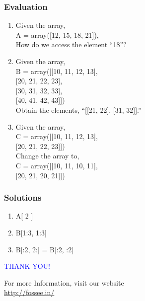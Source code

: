 \documentclass[presentation]{beamer}
\begin{document}
\begin{frame}
\frametitle{Evaluation}
\label{sec-14}


\begin{enumerate}
\item Given the array,\\ A = array([12, 15, 18, 21]),\\ How do we access the element ``18''?
\vspace{2pt}
\item Given the array,\\ 
B = array([[10, 11, 12, 13],\\
\hspace{1.64cm}  
           [20, 21, 22, 23],\\
\hspace{1.64cm}           
           [30, 31, 32, 33],\\
\hspace{1.64cm}           
           [40, 41, 42, 43]])\\
Obtain the elements, ``[[21, 22], [31, 32]].''
\vspace{2pt}         
\item Given the array, \\
 
     C = array([[10, 11, 12, 13],\\
\hspace{1.64cm}     
                [20, 21, 22, 23]])\\

     Change the array to, \\
   
    C = array([[10, 11, 10, 11],\\
\hspace{1.64cm}    
               [20, 21, 20, 21]])
\end{enumerate}
\end{frame}
\begin{frame}
\frametitle{Solutions}
\label{sec-15}


\begin{enumerate}
\item A[ 2 ]
\vspace{12pt}
\item B[1:3, 1:3]
\vspace{12pt}
\item B[:2, 2:] = B[:2, :2]
\end{enumerate}
\end{frame}
\begin{frame}

  \begin{block}{}
  \begin{center}
  \textcolor{blue}{\Large THANK YOU!} 
  \end{center}
  \end{block}
\begin{block}{}
  \begin{center}
    For more Information, visit our website\\
    \url{http://fossee.in/}
  \end{center}  
  \end{block}
\end{frame}
\end{document}
